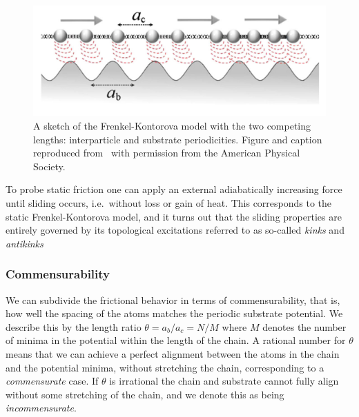 \begin{figure}[!htb]
  \centering
  \includegraphics[width=0.6\linewidth]{figures/theory/FK_model.png}
  \caption{A sketch of the Frenkel-Kontorova model with the two competing lengths: interparticle and substrate periodicities. Figure and caption reproduced from~\cite{Vanossi_2013} with permission from the American Physical Society.}
  \label{fig:FK_model}
\end{figure}

To probe static friction one can apply an external adiabatically increasing force until sliding occurs, i.e.\ without loss or gain of heat. This corresponds to the static Frenkel-Kontorova model, and it turns out that the sliding properties are entirely governed by its topological excitations referred to as so-called \textit{kinks} and \textit{antikinks}

\subsubsection{Commensurability} We can subdivide the frictional behavior in terms of commensurability, that is, how well the spacing of the atoms matches the periodic substrate potential. We describe this by the length ratio $\theta = a_b / a_c = N / M$ where $M$ denotes the number of minima in the potential within the length of the chain. A rational number for $\theta$ means that we can achieve a perfect alignment between the atoms in the chain and the potential minima, without stretching the chain, corresponding to a \textit{commensurate} case. If $\theta$ is irrational the chain and substrate cannot fully align without some stretching of the chain, and we denote this as being \textit{incommensurate}.

